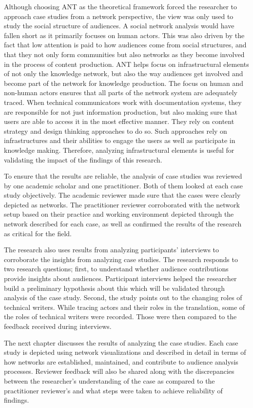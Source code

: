 Although choosing ANT as the theoretical framework forced the researcher to approach case studies from a network perspective, the view was only used to study the social structure of audiences. A social network analysis would have fallen short as it primarily focuses on human actors. This was also driven by the fact that low attention is paid to how audiences come from social structures, and that they not only form communities but also networks as they become involved in the process of content production. ANT helps focus on infrastructural elements of not only the knowledge network, but also the way audiences get involved and become part of the network for knowledge production. The focus on human and non-human actors ensures that all parts of the network system are adequately traced. When technical communicators work with documentation systems, they are responsible for not just information production, but also making sure that users are able to access it in the most effective manner. They rely on content strategy and design thinking approaches to do so. Such approaches rely on infrastructures and their abilities to engage the users as well as participate in knowledge making. Therefore, analyzing infrastructural elements is useful for validating the impact of the findings of this research.

To ensure that the results are reliable, the analysis of case studies was reviewed by one academic scholar and one practitioner. Both of them looked at each case study objectively. The academic reviewer made sure that the cases were clearly depicted as networks. The practitioner reviewer corroborated with the network setup based on their practice and working environment depicted through the network described for each case, as well as confirmed the results of the research as critical for the field.

The research also uses results from analyzing participants' interviews to corroborate the insights from analyzing case studies. The research responds to two research questions; first, to understand whether audience contributions provide insights about audiences. Participant interviews helped the researcher build a preliminary hypothesis about this which will be validated through analysis of the case study. Second, the study points out to the changing roles of technical writers. While tracing actors and their roles in the translation, some of the roles of technical writers were recorded. Those were then compared to the feedback received during interviews.

The next chapter discusses the results of analyzing the case studies. Each case study is depicted using network visualizations and described in detail in terms of how networks are established, maintained, and contribute to audience analysis processes. Reviewer feedback will also be shared along with the discrepancies between the researcher's understanding of the case as compared to the practitioner reviewer's and what steps were taken to achieve reliability of findings.

